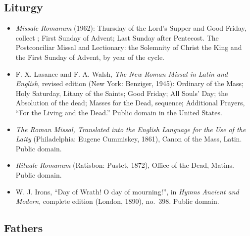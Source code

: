 \subsection*{Liturgy}

{\fontsize{8.6}{9.6}\selectfont
\begin{itemize}[itemsep=0pt,parsep=0pt,topsep=0.05em]
\item \emph{Missale Romanum} (1962): Thursday of the Lord's Supper and Good Friday, collect ; First Sunday of Advent; Last Sunday after Pentecost. The Postconciliar Missal and Lectionary: the Solemnity of Christ the King and the First Sunday of Advent, by year of the cycle.
\item F. X. Lasance and F. A. Walsh, \emph{The New Roman Missal in Latin and English}, revised edition (New York: Benziger, 1945): Ordinary of the Mass; Holy Saturday, Litany of the Saints; Good Friday; All Souls' Day; the Absolution of the dead; Masses for the Dead, sequence; Additional Prayers, ``For the Living and the Dead.'' Public domain in the United States.
\item \emph{The Roman Missal, Translated into the English Language for the Use of the Laity} (Philadelphia: Eugene Cummiskey, 1861), Canon of the Mass, Latin. Public domain.
\item \emph{Rituale Romanum} (Ratisbon: Pustet, 1872), Office of the Dead, Matins. Public domain.
\item W. J. Irons, ``Day of Wrath! O day of mourning!'', in \emph{Hymns Ancient and Modern}, complete edition (London, 1890), no.~398. Public domain.
\end{itemize}}

\subsection*{Fathers}


